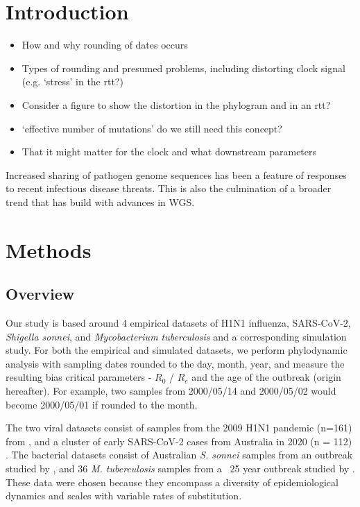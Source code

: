 \documentclass{article}
\begin{document}
\begin{spacing}{1.5}
\section*{Introduction}
\begin{itemize}
    \item How and why rounding of dates occurs
    \item Types of rounding and presumed problems, including distorting clock signal (e.g. `stress' in the rtt?)
    \item Consider a figure to show the distortion in the phylogram and in an rtt?
    \item `effective number of mutations' do we still need this concept?
    \item That it might matter for the clock and what downstream parameters
\end{itemize}

Increased sharing of pathogen genome sequences has been a feature of responses to recent infectious disease threats. This is also the culmination of a broader trend that has build with advances in WGS. 

\section*{Methods}
\subsection*{Overview}
Our study is based around 4 empirical datasets of H1N1 influenza, SARS-CoV-2, \textit{Shigella sonnei}, and \textit{Mycobacterium tuberculosis} and a corresponding simulation study. For both the empirical and simulated datasets, we perform phylodynamic analysis with sampling dates rounded to the day, month, year, and measure the resulting bias critical parameters - $R_0$ / $R_e$ and the age of the outbreak (origin hereafter). For example, two samples from 2000/05/14 and 2000/05/02 would become 2000/05/01 if rounded to the month.

The two viral datasets consist of samples from the 2009 H1N1 pandemic (n=161) from \citet{hedge_2013_real-time}, and a cluster of early SARS-CoV-2 cases from  Australia in 2020 (n = 112) \citep{lane2021genomics}. The bacterial datasets consist of Australian \textit{S. sonnei} samples from an outbreak studied by \citet{ingle_co-circulation_2019}, and 36 \textit{M. tuberculosis} samples from a ~25 year outbreak studied by \citet{kuhnert_tuberculosis_2018}. These data were chosen because they encompass a diversity of epidemiological dynamics and scales with variable rates of substitution.


\end{spacing}
\end{document}
